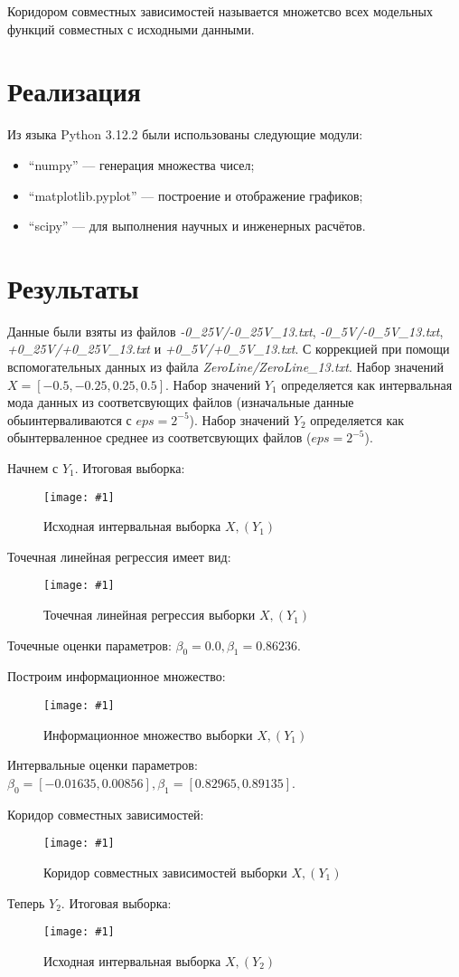 \documentclass[a4paper,12pt]{article}
\newcommand{\plot}[3]{
  \begin{figure}[H]
    \begin{center}
      \texttt{[image: \#1]}
      \caption{#2}
      \label{#3}
    \end{center}
  \end{figure}
}
\begin{document}
\quad Коридором совместных зависимостей называется множетсво всех модельных функций
совместных с исходными данными.

\section{Реализация}
\quad Из языка Python 3.12.2 были использованы следующие модули:
\begin{itemize}
  \item ``numpy'' --- генерация множества чисел;
  \item ``matplotlib.pyplot'' --- построение и отображение графиков;
  \item ``scipy'' --- для выполнения научных и инженерных расчётов.
\end{itemize}

\section{Результаты}
\quad Данные были взяты из файлов \textsl{-0\_25V/-0\_25V\_13.txt}, \textsl{-0\_5V/-0\_5V\_13.txt}, \textsl{+0\_25V/+0\_25V\_13.txt} и
\textsl{+0\_5V/+0\_5V\_13.txt}. С коррекцией при помощи вспомогательных данных из
файла \textsl{ZeroLine/ZeroLine\_13.txt}. Набор значений
$ X = [-0.5, -0.25, 0.25, 0.5] $. Набор значений $ Y_1 $ определяется как интервальная
мода данных из соответсвующих файлов (изначальные данные обыинтерваливаются с
$eps = 2^{-5} $). Набор значений $ Y_2 $ определяется как обынтерваленное среднее
из соответсвующих файлов ($eps = 2^{-5} $).

Начнем с $ Y_1 $. Итоговая выборка:
\plot{./images/X, (Y1).png}{Исходная интервальная выборка $ X, (Y_1) $}{p:y1}

Точечная линейная регрессия имеет вид:
\plot{./images/Regression X, (Y1).png}{Точечная линейная регрессия выборки $ X, (Y_1) $}{p:regY1}

Точечные оценки параметров: $ \beta_0 = 0.0, \beta_1 = 0.86236 $.

Построим информационное множество:
\plot{./images/Inform X, (Y1).png}{Информационное множество выборки $ X, (Y_1) $}{p:infY1}

Интервальные оценки параметров: $ \beta_0 = [-0.01635, 0.00856],
\beta_1 = [0.82965, 0.89135] $.

Коридор совместных зависимостей:
\plot{./images/Corridor X, (Y1).png}{Коридор совместных зависимостей выборки $ X, (Y_1) $}{p:corY1}

Теперь $ Y_2 $. Итоговая выборка:
\plot{./images/X, (Y2).png}{Исходная интервальная выборка $ X, (Y_2) $}{p:y2}
\end{document}
